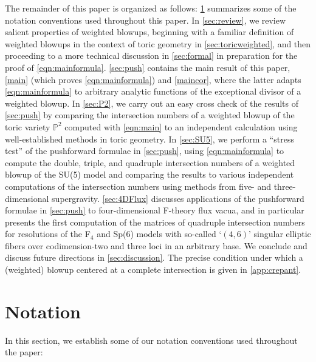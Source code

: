 \documentclass[11pt,oneside,english]{article}
\numberwithin{equation}{section}
\theoremstyle{definition}
\begin{document}
The remainder of this paper is organized as follows: \cref{sec:notation} summarizes some of the notation conventions used throughout this paper. In \cref{sec:review}, we review salient properties of weighted blowups, beginning with a familiar definition of weighted blowups in the context of toric geometry in \cref{sec:toricweighted}, and then proceeding to a more technical discussion in \cref{sec:formal} in preparation for the proof of \cref{eqn:mainformula}. \cref{sec:push} contains the main result of this paper, \cref{main} (which proves \cref{eqn:mainformula}) and \cref{maincor}, where the latter adapts \cref{eqn:mainformula} to arbitrary analytic functions of the exceptional divisor of a weighted blowup. In \cref{sec:P2}, we carry out an easy cross check of the results of \cref{sec:push} by comparing the intersection numbers of a weighted blowup of the toric variety $\mathbb P^2$ computed with \cref{eqn:main} to an independent calculation using well-established methods in toric geometry. In \cref{sec:SU5}, we perform a ``stress test'' of the pushforward formulae in \cref{sec:push}, using \cref{eqn:mainformula} to compute the double, triple, and quadruple intersection numbers of a weighted blowup of the SU(5) model and comparing the results to various independent computations of the intersection numbers using methods from five- and three-dimensional supergravity. \cref{sec:4DFlux} discusses applications of the pushforward formulae in \cref{sec:push} to four-dimensional F-theory flux vacua, and in particular presents the first computation of the matrices of quadruple intersection numbers for resolutions of the F$_4$ and Sp($6$) models with so-called `$(4,6)$' singular elliptic fibers over codimension-two and three loci in an arbitrary base. We conclude and discuss future directions in \cref{sec:discussion}. The precise condition under which a (weighted) blowup centered at a complete intersection is given in \cref{app:crepant}. 


\section{Notation}
\label{sec:notation}

In this section, we establish some of our notation conventions used throughout the paper:
\end{document}
